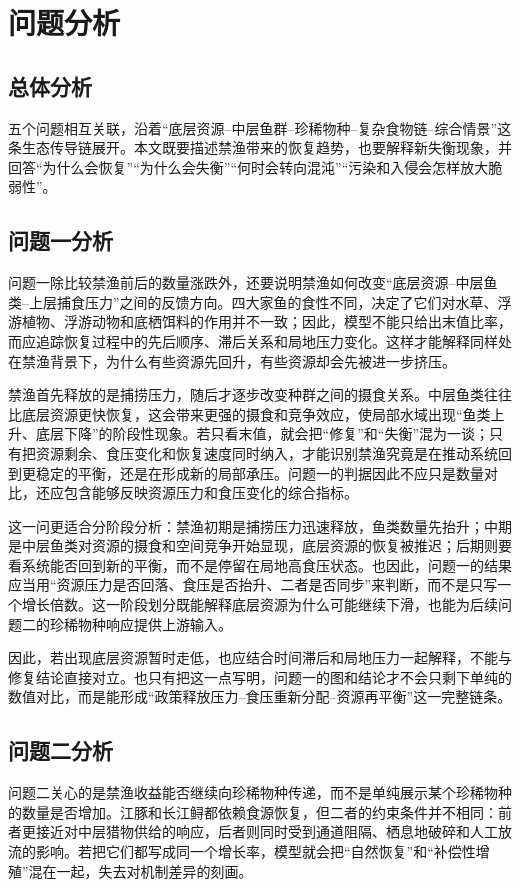 \section{问题分析}
\subsection{总体分析}
五个问题相互关联，沿着“底层资源--中层鱼群--珍稀物种--复杂食物链--综合情景”这条生态传导链展开。本文既要描述禁渔带来的恢复趋势，也要解释新失衡现象，并回答“为什么会恢复”“为什么会失衡”“何时会转向混沌”“污染和入侵会怎样放大脆弱性”。

\subsection{问题一分析}
问题一除比较禁渔前后的数量涨跌外，还要说明禁渔如何改变“底层资源--中层鱼类--上层捕食压力”之间的反馈方向。四大家鱼的食性不同，决定了它们对水草、浮游植物、浮游动物和底栖饵料的作用并不一致；因此，模型不能只给出末值比率，而应追踪恢复过程中的先后顺序、滞后关系和局地压力变化。这样才能解释同样处在禁渔背景下，为什么有些资源先回升，有些资源却会先被进一步挤压。

禁渔首先释放的是捕捞压力，随后才逐步改变种群之间的摄食关系。中层鱼类往往比底层资源更快恢复，这会带来更强的摄食和竞争效应，使局部水域出现“鱼类上升、底层下降”的阶段性现象。若只看末值，就会把“修复”和“失衡”混为一谈；只有把资源剩余、食压变化和恢复速度同时纳入，才能识别禁渔究竟是在推动系统回到更稳定的平衡，还是在形成新的局部承压。问题一的判据因此不应只是数量对比，还应包含能够反映资源压力和食压变化的综合指标。

这一问更适合分阶段分析：禁渔初期是捕捞压力迅速释放，鱼类数量先抬升；中期是中层鱼类对资源的摄食和空间竞争开始显现，底层资源的恢复被推迟；后期则要看系统能否回到新的平衡，而不是停留在局地高食压状态。也因此，问题一的结果应当用“资源压力是否回落、食压是否抬升、二者是否同步”来判断，而不是只写一个增长倍数。这一阶段划分既能解释底层资源为什么可能继续下滑，也能为后续问题二的珍稀物种响应提供上游输入。

因此，若出现底层资源暂时走低，也应结合时间滞后和局地压力一起解释，不能与修复结论直接对立。也只有把这一点写明，问题一的图和结论才不会只剩下单纯的数值对比，而是能形成“政策释放压力--食压重新分配--资源再平衡”这一完整链条。

\subsection{问题二分析}
问题二关心的是禁渔收益能否继续向珍稀物种传递，而不是单纯展示某个珍稀物种的数量是否增加。江豚和长江鲟都依赖食源恢复，但二者的约束条件并不相同：前者更接近对中层猎物供给的响应，后者则同时受到通道阻隔、栖息地破碎和人工放流的影响。若把它们都写成同一个增长率，模型就会把“自然恢复”和“补偿性增殖”混在一起，失去对机制差异的刻画。

